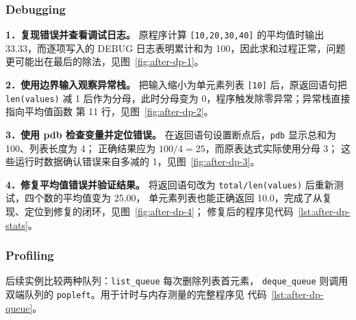 \documentclass[12pt,a4paper,fontset=fandol]{ctexart}
\begin{document}
\subsubsection*{Debugging}

\noindent\textbf{1．复现错误并查看调试日志。}
原程序计算 \texttt{[10,20,30,40]} 的平均值时输出 33.33，而逐项写入的 DEBUG
日志表明累计和为 100，因此求和过程正常，问题更可能出在最后的除法，见图~\ref{fig:after-dp-1}。

\noindent\textbf{2．使用边界输入观察异常栈。}
把输入缩小为单元素列表 \texttt{[10]} 后，原返回语句把 \texttt{len(values)}
减 1 后作为分母，此时分母变为 0，程序触发除零异常；异常栈直接指向平均值函数
第 11 行，见图~\ref{fig:after-dp-2}。

\noindent\textbf{3．使用 pdb 检查变量并定位错误。}
在返回语句设置断点后，\texttt{pdb} 显示总和为 100、列表长度为 4；
正确结果应为 \(100/4=25\)，而原表达式实际使用分母 3；
这些运行时数据确认错误来自多减的 1，见图~\ref{fig:after-dp-3}。

\noindent\textbf{4．修复平均值错误并验证结果。}
将返回语句改为 \texttt{total/len(values)} 后重新测试，四个数的平均值变为 25.00，
单元素列表也能正确返回 10.0，完成了从复现、定位到修复的闭环，见图~\ref{fig:after-dp-4}；
修复后的程序见代码~\ref{lst:after-dp-stats}。



\subsubsection*{Profiling}

后续实例比较两种队列：\texttt{list\_queue} 每次删除列表首元素，
\texttt{deque\_queue} 则调用双端队列的 \texttt{popleft}。用于计时与内存测量的完整程序见
代码~\ref{lst:after-dp-queue}。


\end{document}
